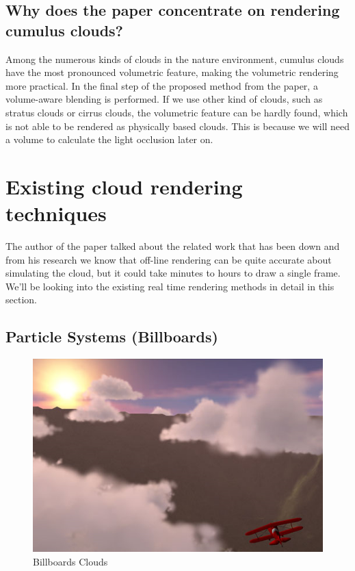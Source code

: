 \subsection{Why does the paper concentrate on rendering cumulus clouds?}
Among the numerous kinds of clouds in the nature environment, cumulus clouds have the most pronounced volumetric feature, making the volumetric rendering more practical. In the final step of the proposed method from the paper, a volume-aware blending is performed. If we use other kind of clouds, such as stratus clouds or cirrus clouds, the volumetric feature can be hardly found, which is not able to be rendered as physically based clouds. This is because we will need a volume to calculate the light occlusion later on.

\section{Existing cloud rendering techniques}
The author of the paper talked about the related work that has been down and from his research we know that off-line rendering can be quite accurate about simulating the cloud, but it could take minutes to hours to draw a single frame. We'll be looking into the existing real time rendering methods in detail in this section.

\subsection{Particle Systems (Billboards)}

\begin{figure}[htp]
\begin{center}
\includegraphics[scale=0.6]{images/billboards.png}
\caption{Billboards Clouds}
\label{f2}
\end{center}
\end{figure}

